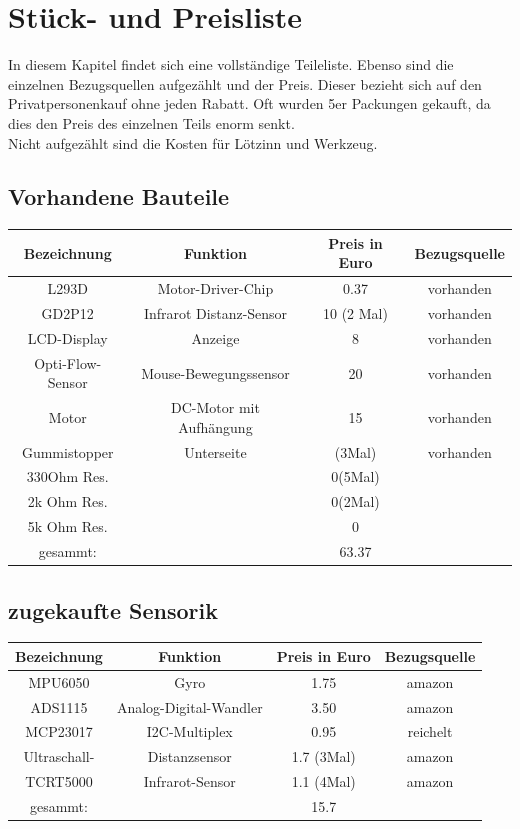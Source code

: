 \documentclass[a4paper,cleardoubleempty,BCOR1cm]{book}
\begin{document}
\chapter{Stück- und Preisliste}
In diesem Kapitel findet sich eine vollständige Teileliste. Ebenso sind die einzelnen Bezugsquellen aufgezählt und der Preis. Dieser bezieht sich auf den Privatpersonenkauf ohne jeden Rabatt. Oft wurden 5er Packungen gekauft, da dies den Preis des einzelnen Teils enorm senkt. \\
Nicht aufgezählt sind die Kosten für Lötzinn und Werkzeug. 

\section{Vorhandene Bauteile}
\begin{center}
	\begin{tabular}{|c|c|c|c|}
		\hline
		Bezeichnung			&Funktion				& Preis	in Euro	&Bezugsquelle\\
		\hline
		L293D				&Motor-Driver-Chip		& 0.37			& vorhanden		\\
		GD2P12				&Infrarot Distanz-Sensor& 10 (2 Mal)	& vorhanden\\
		LCD-Display			&Anzeige				& 8				& vorhanden	\\
		Opti-Flow-Sensor	&Mouse-Bewegungssensor		& 20			& vorhanden\\
		Motor				& DC-Motor mit Aufhängung& 15			& vorhanden\\
		Gummistopper		& Unterseite			& (3Mal)		& vorhanden \\
		330Ohm Res.			&						& 0(5Mal)		& \\
		2k Ohm Res.			&						& 0(2Mal)		& \\
		5k Ohm Res.			&						& 0				& \\
		\hline
		gesammt:			&						&63.37&\\
		\hline
	\end{tabular}
\end{center}


\section{zugekaufte Sensorik}
\begin{center}
	\begin{tabular}{|c|c|c|c|}
		\hline
		Bezeichnung			&Funktion				& Preis	in Euro			&Bezugsquelle\\
		\hline
		MPU6050				&Gyro					& 1.75			& amazon		\\
		ADS1115				&Analog-Digital-Wandler	& 3.50			& amazon		\\
		MCP23017			&I2C-Multiplex			& 0.95			& reichelt		\\
		Ultraschall-		&Distanzsensor			& 1.7 (3Mal)	& amazon		\\
		TCRT5000			&Infrarot-Sensor		& 1.1 (4Mal)	& amazon		\\
		\hline
		gesammt:			&						&15.7			&\\
		\hline			
	\end{tabular}
\end{center}
\end{document}

